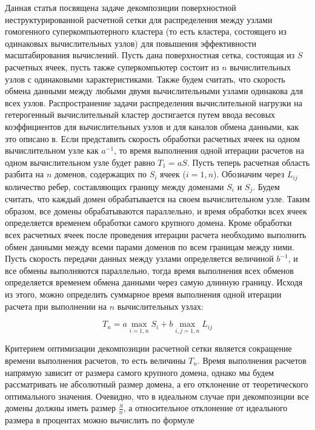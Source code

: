 \documentclass[
11pt,%
tightenlines,%
twoside,%
onecolumn,%
nofloats,%
nobibnotes,%
nofootinbib,%
superscriptaddress,%
noshowpacs,%
centertags]%
{revtex4}
\begin{document}
Данная статья посвящена задаче декомпозиции поверхностной неструктурированной расчетной сетки для распределения между узлами гомогенного суперкомпьютерного кластера (то есть кластера, состоящего из одинаковых вычислительных узлов) для повышения эффективности масштабирования вычислений.
Пусть дана поверхностная сетка, состоящая из $S$ расчетных ячеек, пусть также суперкомпьютер состоит из $n$ вычислительных узлов с одинаковыми характеристиками.
Также будем считать, что скорость обмена данными между любыми двумя вычислительными узлами одинакова для всех узлов.
Распространение задачи распределения вычислительной нагрузки на гетерогенный вычислительный кластер достигается путем ввода весовых коэффициентов для вычислительных узлов и для каналов обмена данными, как это описано в.
Если представить скорость обработки расчетных ячеек на одном вычислительном узле как $a^{-1}$, то время выполнения одной итерации расчетов на одном вычислительном узле будет равно $T_1 = aS$.
Пусть теперь расчетная область разбита на $n$ доменов, содержащих по $S_i$ ячеек ($i=1,n$).
Обозначим через $L_{ij}$ количество ребер, составляющих границу между доменами $S_i$ и $S_j$.
Будем считать, что каждый домен обрабатывается на своем вычислительном узле.
Таким образом, все домены обрабатываются параллельно, и время обработки всех ячеек определяется временем обработки самого крупного домена.
Кроме обработки всех расчетных ячеек после проведения итерации расчета необходимо выполнить обмен данными между всеми парами доменов по всем границам между ними.
Пусть скорость передачи данных между узлами определяется величиной $b^{-1}$, и все обмены выполняются параллельно, тогда время выполнения всех обменов определяется временем обмена данными через самую длинную границу.
Исходя из этого, можно определить суммарное время выполнения одной итерации расчета при выполнении на $n$ вычислительных узлах:

\begin{equation}
T_n = a \max_{i = 1,n}{S_i} + b \max_{i,j=1,n}{L_{ij}}
\end{equation}

Критерием оптимизации декомпозиции расчетной сетки является сокращение времени выполнения расчетов, то есть величины $T_n$.
Время выполнения расчетов напрямую зависит от размера самого крупного домена, однако мы будем рассматривать не абсолютный размер домена, а его отклонение от теоретического оптимального значения.
Очевидно, что в идеальном случае при декомпозиции все домены должны иметь размер $\frac{S}{n}$, а относительное отклонение от идеального размера в процентах можно вычислить по формуле
\end{document}
